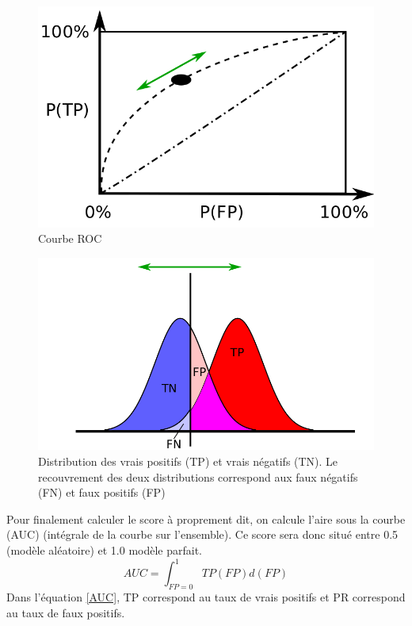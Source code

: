 	
	\begin{figure}[H]
	\caption{Courbe ROC}
	\includegraphics[scale=0.4]{./figs/ROC_1.png}
	\end{figure}
	\begin{figure}[H]
	\caption{Distribution des vrais positifs (TP) et vrais négatifs (TN). Le recouvrement des deux distributions
	 		 correspond aux faux négatifs (FN) et faux positifs (FP)}
	\label{distrib}
	\includegraphics[scale=0.4]{./figs/ROC_2.png}
	\end{figure}
	Pour finalement calculer le score à proprement dit, on calcule l'aire sous la courbe (AUC) 
	(intégrale de la courbe sur l'ensemble). Ce score sera donc situé entre 0.5 (modèle aléatoire) et 1.0 modèle parfait.
	\begin{equation}
	\label{AUC}
	AUC = \int_{FP=0}^1 TP(FP) d(FP)
	\end{equation}
	Dans l'équation \ref{AUC}, TP correspond au taux de vrais positifs et PR correspond au taux de faux positifs.
	
